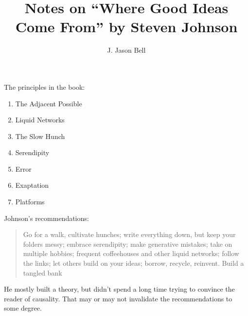 \documentclass[11pt, oneside]{article}   	%
\title{Notes on ``Where Good Ideas Come From'' by Steven Johnson}
\author{J. Jason Bell}
\date{}							%
\begin{document}
 \maketitle

The principles in the book:

\begin{enumerate}
\item The Adjacent Possible
\item Liquid Networks
\item The Slow Hunch
\item Serendipity
\item Error
\item Exaptation
\item Platforms
\end{enumerate}

Johnson's recommendations:
\begin{quote}
Go for a walk, cultivate hunches; write everything down, but keep your folders messy; embrace serendipity; make generative mistakes; take on multiple hobbies; frequent coffeehouses and other liquid networks; follow the links; let others build on your ideas; borrow, recycle, reinvent.  Build a tangled bank
\end{quote}

He mostly built a theory, but didn't spend a long time trying to convince the reader of causality.  That may or may not invalidate the recommendations to some degree.
\end{document}
